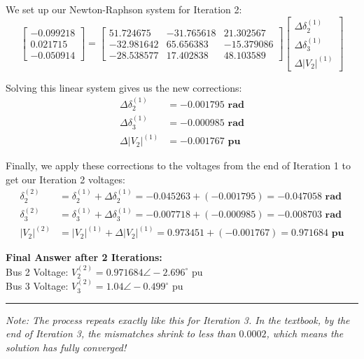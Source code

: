 \documentclass[11pt]{article}
\begin{document}
\begin{stepbox}
We set up our Newton-Raphson system for Iteration 2:
\begin{equation*}
\begin{bmatrix} -0.099218 \\ 0.021715 \\ -0.050914 \end{bmatrix} 
= 
\begin{bmatrix} 
51.724675 & -31.765618 & 21.302567 \\ 
-32.981642 & 65.656383 & -15.379086 \\ 
-28.538577 & 17.402838 & 48.103589 
\end{bmatrix} 
\begin{bmatrix} \Delta \delta_2^{(1)} \\ \Delta \delta_3^{(1)} \\ \Delta |V_2|^{(1)} \end{bmatrix}
\end{equation*}

Solving this linear system gives us the new corrections:
\begin{align*}
    \Delta \delta_2^{(1)} &= \mathbf{-0.001795 \text{ rad}} \\
    \Delta \delta_3^{(1)} &= \mathbf{-0.000985 \text{ rad}} \\
    \Delta |V_2|^{(1)} &= \mathbf{-0.001767 \text{ pu}}
\end{align*}

Finally, we apply these corrections to the voltages from the end of Iteration 1 to get our Iteration 2 voltages:
\begin{align*}
    \delta_2^{(2)} &= \delta_2^{(1)} + \Delta \delta_2^{(1)} = -0.045263 + (-0.001795) = \mathbf{-0.047058 \text{ rad}} \\
    \delta_3^{(2)} &= \delta_3^{(1)} + \Delta \delta_3^{(1)} = -0.007718 + (-0.000985) = \mathbf{-0.008703 \text{ rad}} \\
    |V_2|^{(2)} &= |V_2|^{(1)} + \Delta |V_2|^{(1)} = 0.973451 + (-0.001767) = \mathbf{0.971684 \text{ pu}}
\end{align*}

\textbf{Final Answer after 2 Iterations:}\\
Bus 2 Voltage: $V_2^{(2)} = 0.971684 \angle -2.696^\circ \text{ pu}$ \\
Bus 3 Voltage: $V_3^{(2)} = 1.04 \angle -0.499^\circ \text{ pu}$

\vspace{0.3cm}
\hrule
\vspace{0.3cm}
\textit{Note: The process repeats exactly like this for Iteration 3. In the textbook, by the end of Iteration 3, the mismatches shrink to less than $0.0002$, which means the solution has fully converged!}
\end{stepbox}
\end{document}
